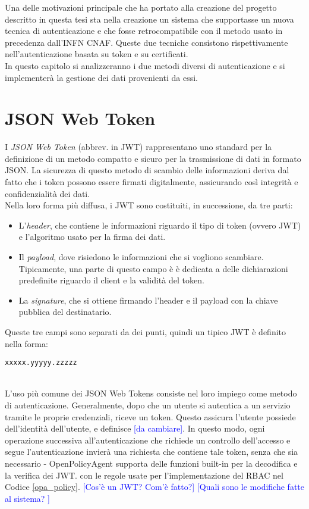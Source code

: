 Una delle motivazioni principale che ha portato alla creazione del progetto descritto in questa tesi 
sta nella creazione un sistema che supportasse 
un nuova tecnica di autenticazione e che fosse retrocompatibile con il metodo usato in precedenza dall'INFN CNAF.  
Queste due tecniche consistono rispettivamente nell'autenticazione basata su token e su certificati.    
\\ In questo capitolo si analizzeranno i due metodi diversi di autenticazione e si implementerà la gestione 
dei dati provenienti da essi.

\section{JSON Web Token}
I \textit{JSON Web Token} (abbrev. in JWT) rappresentano uno standard per la definizione di un metodo 
compatto e sicuro per la trasmissione di dati in formato JSON. La sicurezza di questo metodo di scambio delle 
informazioni deriva dal fatto che i token possono essere firmati digitalmente, assicurando così integrità e confidenzialità dei dati.  
\\ Nella loro forma più diffusa, i JWT sono costituiti, in successione, da tre parti:
\begin{itemize}
    \item L'\textit{header}, che contiene le informazioni riguardo il tipo di token (ovvero JWT) e 
    l'algoritmo usato per la firma dei dati. 
    \item Il \textit{payload}, dove risiedono le informazioni che si vogliono scambiare. Tipicamente, una parte di questo campo è 
    è dedicata a delle dichiarazioni predefinite riguardo il client e la validità del token. 
    \item La \textit{signature}, che si ottiene firmando l'header e il payload con la chiave pubblica del destinatario.
\end{itemize}
Queste tre campi sono separati da dei punti, quindi un tipico JWT è definito nella forma:
\\ \centerline{\texttt{xxxxx.yyyyy.zzzzz}}
\\ L'uso più comune dei JSON Web Tokens consiste nel loro impiego come metodo di autenticazione. Generalmente, dopo che un utente si 
autentica a un servizio tramite le proprie credenziali, riceve un token. Questo assicura l'utente possiede dell'identità dell'utente, 
e definisce  \textcolor{blue}{[da cambiare]}. In questo modo, ogni operazione successiva all'autenticazione che richiede un controllo dell'accesso 
e segue l'autenticazione invierà una richiesta che contiene tale token, senza che sia necessario  
-
OpenPolicyAgent supporta delle funzioni built-in per la decodifica e la verifica dei JWT.
con le regole usate per l'implementazione del RBAC nel Codice \ref*{opa_policy}. 
\textcolor{blue}{[Cos'è un JWT? Com'è fatto?]}
\textcolor{blue}{[Quali sono le modifiche fatte al sistema? ]}

